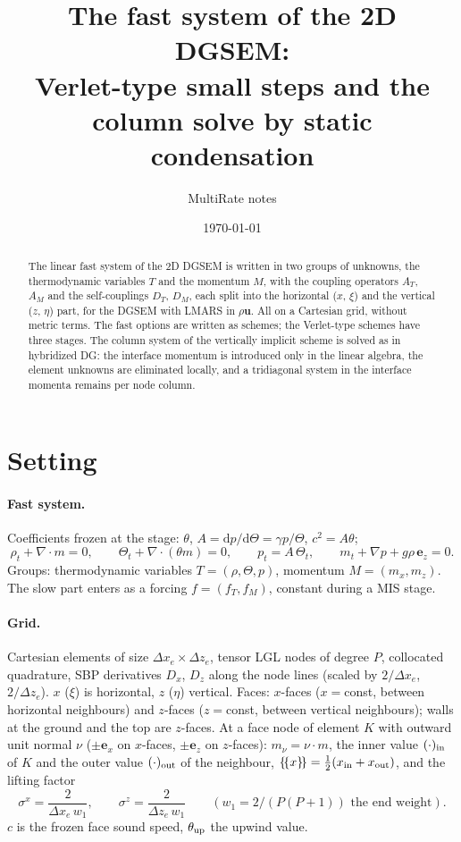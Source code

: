 \documentclass[11pt,a4paper]{article}
\title{The fast system of the 2D DGSEM:\\Verlet-type small steps and the column solve by static condensation}
\author{MultiRate notes}
\date{\today}
\newcommand{\avg}[1]{\{\!\{#1\}\!\}}
\begin{document}
\maketitle

\begin{abstract}
The linear fast system of the 2D DGSEM is written in two groups of unknowns, the thermodynamic variables $T$ and the momentum
$M$, with the coupling operators $A_T$, $A_M$ and the self-couplings $D_T$, $D_M$, each split into the horizontal ($x$, $\xi$) and the vertical
($z$, $\eta$) part, for the DGSEM with LMARS in $\rho\mathbf u$. All on a Cartesian grid, without metric terms. The fast options are
written as schemes; the Verlet-type schemes have three stages. The column system of the vertically implicit scheme is solved as in
hybridized DG: the interface momentum is introduced only in the linear algebra, the element unknowns are eliminated locally, and a
tridiagonal system in the interface momenta remains per node column.
\end{abstract}

\section{Setting}
\paragraph{Fast system.} Coefficients frozen at the stage: $\theta$, $A=\mathrm dp/\mathrm d\Theta=\gamma p/\Theta$, $c^2=A\theta$;
\[
\rho_t+\nabla\cdot m=0,\qquad \Theta_t+\nabla\cdot(\theta m)=0,\qquad p_t=A\,\Theta_t,\qquad m_t+\nabla p+g\rho\,\mathbf e_z=0 .
\]
Groups: thermodynamic variables $T=(\rho,\Theta,p)$, momentum $M=(m_x,m_z)$.
The slow part enters as a forcing $f=(f_T,f_M)$, constant during a MIS stage.

\paragraph{Grid.} Cartesian elements of size $\Delta x_e\times\Delta z_e$, tensor LGL nodes of degree $P$, collocated quadrature, SBP derivatives $D_x$, $D_z$
along the node lines (scaled by $2/\Delta x_e$, $2/\Delta z_e$). $x$ ($\xi$) is horizontal, $z$ ($\eta$) vertical. Faces: $x$-faces ($x=$const, between horizontal
neighbours) and $z$-faces ($z=$const, between vertical neighbours); walls at the ground and the top are $z$-faces. At a face node of
element $K$ with outward unit normal $\nu$ ($\pm\mathbf e_x$ on $x$-faces, $\pm\mathbf e_z$ on $z$-faces): $m_\nu=\nu\cdot m$, the inner value $(\cdot)_{\rm in}$ of $K$ and the
outer value $(\cdot)_{\rm out}$ of the neighbour, $\avg x=\tfrac12(x_{\rm in}+x_{\rm out})$, and the lifting factor
\[
\sigma^x=\frac{2}{\Delta x_e\,w_1},\qquad \sigma^z=\frac{2}{\Delta z_e\,w_1}\qquad(w_1=2/(P(P+1))\text{ the end weight}).
\]
$c$ is the frozen face sound speed, $\theta_{\rm up}$ the upwind value.
\end{document}
